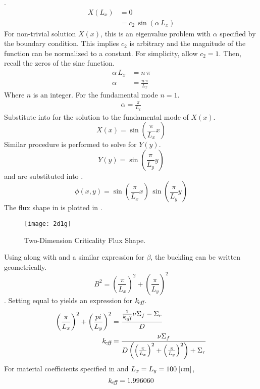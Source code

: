   .
  \begin{align}
    X(L_x) &= 0 \\
    &= c_2 \, \sin(\alpha \, L_x)
  \end{align}
  For non-trivial solution $X(x)$, this is an eigenvalue problem with $\alpha$
  specified by the boundary condition. This implies $c_2$ is arbitrary and the
  magnitude of the function can be normalized to a constant. For simplicity,
  allow $c_2 = 1$. Then, recall the zeros of the sine function.
  \begin{align}
    \alpha \, L_x &= n \, \pi \\
    \alpha &= \frac{n \, \pi}{L_x}
  \end{align}
  Where $n$ is an integer. For the fundamental mode $n=1$.
  \begin{align}
    \label{eq:2d1g_x_alpha}
    \alpha = \frac{\pi}{L_x}
  \end{align}
  Substitute  into  for the solution
  to the fundamental mode of $X(x)$.
  \begin{equation}
    \label{eq:2d1g_x_solution}
    X(x) = \sin\left(\frac{\pi}{L_x} x \right)
  \end{equation}
  Similar procedure is performed to solve for $Y(y)$.
  \begin{equation}
    \label{eq:2d1g_y_solution}
    Y(y) = \sin\left(\frac{\pi}{L_y} y \right)
  \end{equation}
   and  are substituted into
  .
  \begin{equation}
    \label{eq:analytic_2d1g}
    \phi(x,y) = \sin\left(\frac{\pi}{L_x} x\right) \, 
      \sin\left(\frac{\pi}{L_y} y\right)
  \end{equation}
  The flux shape in  is plotted in .
  \begin{figure}
    \centering
    \texttt{[image: 2d1g]}
    \caption{Two-Dimension Criticality Flux Shape.}
    \label{fig:2d1g}
  \end{figure}
  Using  along with  and a
  similar expression for $\beta$, the buckling can be written geometrically.
  \begin{equation}
    \label{eq:2d1g_buckle_geom}
    B^2 = \left(\frac{\pi}{L_x}\right)^2 + \left(\frac{\pi}{L_y}\right)^2
  \end{equation}.
  Setting  equal to  yields an
  expression for $k_{\!\mbox{\scriptsize \em eff}}$.
  \begin{align}
    \left(\frac{\pi}{L_x}\right)^2 + \left(\frac{pi}{L_y}\right)^2 &=
      \frac{\frac{1}{k_{\!\mbox{\scriptsize \em eff}}} \nu \Sigma_f - \Sigma_r}{D} \\
    k_{\!\mbox{\scriptsize \em eff}} &= \frac{\nu \Sigma_f}{D \left( \left(\frac{\pi}{L_x}\right)^2 + 
      \left( \frac{\pi}{L_y}\right)^2 \right) + \Sigma_r}
  \end{align}
  For material coefficients specified in  and
  $L_x=L_y=100 \;\text{[{cm}]}$, 
  \begin{equation}
    \label{eq:keff2d}
    k_{\!\mbox{\scriptsize \em eff}} = 1.996060
  \end{equation}
  
